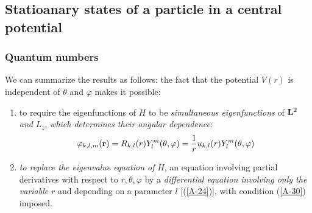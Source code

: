 \subsection{Statioanary states of a particle in a central potential}
\subsubsection{Quantum numbers}
We can summarize the results as follows: the fact that the potential $V(r)$ is independent of $\theta$ and $\varphi$ makes it possible:
\begin{enumerate}
	\item to require the eigenfunctions of $H$ to be \textit{simultaneous eigenfunctions} of $\vb{L}^2$ \textit{and} $L_z$, \textit{which determines their angular dependence}:
		\begin{equation}\label{A-31}
	\varphi_{k,l,m}(\vb{r})=R_{k,l}(r)Y_l^m(\theta,\varphi)=\frac{1}{r}u_{k,l}(r)Y_l^m(\theta,\varphi)
\end{equation}
\item \textit{to replace the eigenvalue equation of} $H$, an equation involving partial derivatives with respect to $r,\theta,\varphi$ by a \textit{differential equation involving only the variable} $r$ and depending on a parameter $l$ [(\ref{A-24})], with condition (\ref{A-30}) imposed.
\end{enumerate}

